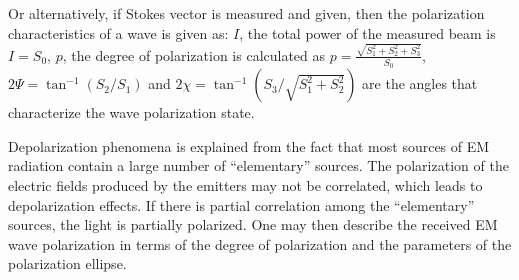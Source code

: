 Or alternatively, if Stokes vector is measured and given, then the polarization characteristics of a wave is given as:
$I$, the total power of the measured beam is $I=S_0$,
$p$, the degree of polarization is calculated as $p = \frac{\sqrt{ S_1^2 + S_2^2 + S_3^2 }}{S_0}$,
$2\Psi = \tan^{-1} (S_2/S_1) $ and $2 \chi = \tan^{-1} (S_3 / \sqrt{S_1^2 + S_2^2})$ are the angles that characterize the wave polarization state.

Depolarization phenomena is explained from the fact that most sources of EM radiation contain a large number of ``elementary'' sources.
The polarization of the electric fields produced by the emitters may not be correlated, which leads to depolarization effects.
If there is partial correlation among the ``elementary'' sources, the light is partially polarized. 
One may then describe the received EM wave polarization in terms of the degree of polarization and the parameters of the polarization ellipse.


